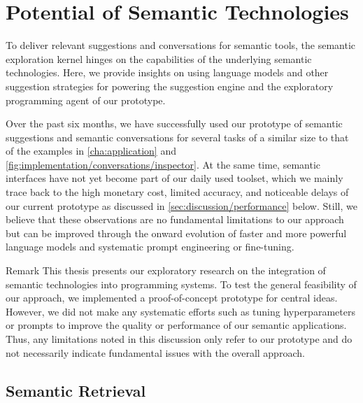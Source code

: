 
\section{Potential of Semantic Technologies}
\label{sec:discussion/feasibility}

To deliver relevant suggestions and conversations for semantic tools, the semantic exploration kernel hinges on the capabilities of the underlying semantic technologies.
Here, we provide insights on using language models and other suggestion strategies for powering the suggestion engine and the exploratory programming agent of our prototype.

Over the past six months, we have successfully used our prototype of semantic suggestions and semantic conversations for several tasks of a similar size to that of the examples in \cref{cha:application} and \cref{fig:implementation/conversations/inspector}. %
At the same time, semantic interfaces have not yet become part of our daily used toolset, which we mainly trace back to the high monetary cost, limited accuracy, and noticeable delays of our current prototype as discussed in \cref{sec:discussion/performance} below.
Still, we believe that these observations are no fundamental limitations to our approach but can be improved through the onward evolution of faster and more powerful language models and systematic prompt engineering or fine-tuning.

\begin{genericbox}{Remark}
	This thesis presents our exploratory research on the integration of semantic technologies into programming systems.
	To test the general feasibility of our approach, we implemented a proof-of-concept prototype for central ideas.
	However, we did not make any systematic efforts such as tuning hyperparameters or prompts to improve the quality or performance of our semantic applications.
	Thus, any limitations noted in this discussion only refer to our prototype and do not necessarily indicate fundamental issues with the overall approach.
\end{genericbox}

\subsection{Semantic Retrieval}
\label{sec:discussion/feasibility/retrieval}


